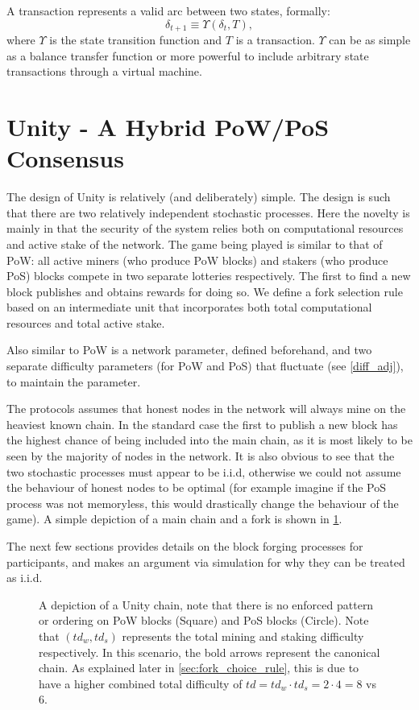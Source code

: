 \documentclass[a4paper]{article}
\begin{document}
A transaction represents a valid arc between two states, formally:
$$
    \delta_{t+1} \equiv \Upsilon(\delta_t, T),
$$
where $\Upsilon$ is the state transition function and $T$ is a transaction. $\Upsilon$ can be as simple as a balance transfer function or more powerful to include arbitrary state transactions through a virtual machine.

\section{Unity - A Hybrid PoW/PoS Consensus}

The design of Unity is relatively (and deliberately) simple. The design is such that there are two relatively independent stochastic processes. Here the novelty is mainly in that the security of the system relies both on computational resources and active stake of the network. The game being played is similar to that of PoW: all active miners (who produce PoW blocks) and stakers (who produce PoS) blocks compete in two separate lotteries respectively. The first to find a new block publishes and obtains rewards for doing so. We define a fork selection rule based on an intermediate unit that incorporates both total computational resources and total active stake.

Also similar to PoW is a network parameter, defined beforehand, and two separate difficulty parameters (for PoW and PoS) that fluctuate (see \cref{diff_adj}), to maintain the parameter.

The protocols assumes that honest nodes in the network will always mine on the heaviest known chain. In the standard case the first to publish a new block has the highest chance of being included into the main chain, as it is most likely to be seen by the majority of nodes in the network. It is also obvious to see that the two stochastic processes must appear to be i.i.d, otherwise we could not assume the behaviour of honest nodes to be optimal (for example imagine if the PoS process was not memoryless, this would drastically change the behaviour of the game). A simple depiction of a main chain and a fork is shown in \cref{fig:high_level_unity}.

The next few sections provides details on the block forging processes for participants, and makes an argument via simulation for why they can be treated as i.i.d.

\begin{figure}[h]
    \centering
    
    \caption{A depiction of a Unity chain, note that there is no enforced pattern or ordering on PoW blocks (Square) and PoS blocks (Circle). Note that $(td_w, td_s)$ represents the total mining and staking difficulty respectively. In this scenario, the bold arrows represent the canonical chain. As explained later in \cref{sec:fork_choice_rule}, this is due to have a higher combined total difficulty of $td=td_w \cdot td_s=2 \cdot 4=8$ vs $6$.}
    \label{fig:high_level_unity}
\end{figure}
\end{document}

